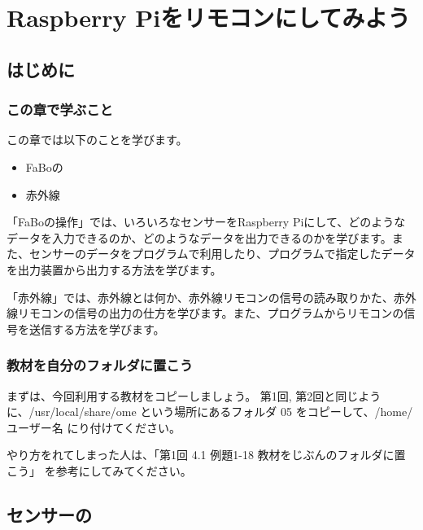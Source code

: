 \chapter{Raspberry Piをリモコンにしてみよう}
\section{はじめに}
\subsection{この章で学ぶこと}

この章では以下のことを学びます。
\begin{itemize}
\item FaBoの
\item 赤外線
\end{itemize}

「FaBoの操作」では、いろいろなセンサーをRaspberry Piにして、どのようなデータを入力できるのか、どのようなデータを出力できるのかを学びます。また、センサーのデータをプログラムで利用したり、プログラムで指定したデータを出力装置から出力する方法を学びます。

「赤外線」では、赤外線とは何か、赤外線リモコンの信号の読み取りかた、赤外線リモコンの信号の出力の仕方を学びます。また、プログラムからリモコンの信号を送信する方法を学びます。

\subsection{教材を自分のフォルダに置こう}
まずは、今回利用する教材をコピーしましょう。
第1回, 第2回と同じように、\nobreak/usr/local/share/ome という場所にあるフォルダ 05 をコピーして、/home/ユーザー名 にり付けてください。

やり方をれてしまった人は、「第1回 4.1 例題1-18 教材をじぶんのフォルダに置こう」 を参考にしてみてください。


\section{センサーの}

